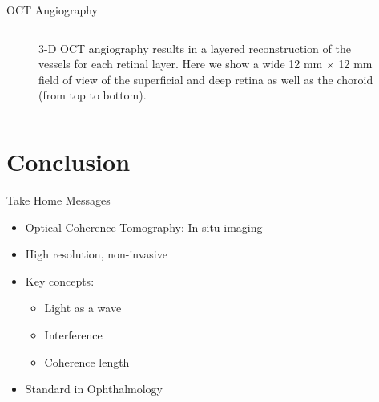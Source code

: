 \begin{frame}{OCT Angiography}
\begin{columns}[c, onlytextwidth]
\begin{column}{0.5\textwidth}
\begin{figure}[tbp]
                \caption{3-D OCT angiography results in a layered reconstruction of the vessels for each retinal layer. Here we show a wide 12 mm $\times$ 12 mm field of view of the superficial and deep retina as well as the choroid (from top to bottom).}
                \label{fig:oct_acta}
            \end{figure}
        \end{column}
    \end{columns}

\end{frame}


\section{Conclusion}

\begin{frame}[c]{Take Home Messages}
    \begin{itemize}
        \setlength\itemsep{0.3cm}
        \item<2-> Optical Coherence Tomography: In situ imaging
        \item<3-> High resolution, non-invasive
        \item<4-> Key concepts:
              \begin{itemize}
                  \item Light as a wave
                  \item Interference
                  \item Coherence length
              \end{itemize}
        \item<5-> Standard in Ophthalmology
    \end{itemize}
\end{frame}



